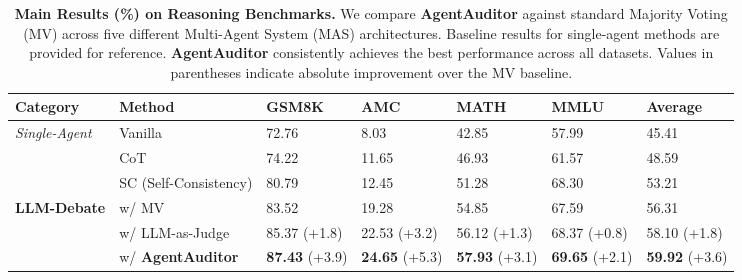 \documentclass{article}
\newcommand{\cgap}[1]{\scriptsize{\color{teal}(+#1)}}
\theoremstyle{plain}
\theoremstyle{definition}
\theoremstyle{remark}
\begin{document}



\begin{table}[t]
\centering
\small
\setlength{\tabcolsep}{6pt} 
\renewcommand{\arraystretch}{0.9}
\caption{
\textbf{Main Results (\%) on Reasoning Benchmarks.} 
We compare \textbf{AgentAuditor} against standard Majority Voting (MV) across five different Multi-Agent System (MAS) architectures. 
Baseline results for single-agent methods are provided for reference.
\textbf{AgentAuditor} consistently achieves the best performance across all datasets.
Values in parentheses indicate absolute improvement over the MV baseline.
}
\label{tab:main_results}

\begin{tabular}{l l l l l l l}
\textbf{Category} & \textbf{Method} & \textbf{GSM8K} & \textbf{AMC} & \textbf{MATH} & \textbf{MMLU} & \textbf{Average} \\
\toprule
\multirow{3}{*}{\textit{Single-Agent}} 
 & Vanilla & 72.76 & 8.03 & 42.85 & 57.99 & 45.41 \\
 & CoT     & 74.22 & 11.65 & 46.93 & 61.57 & 48.59 \\
 & SC (Self-Consistency) & 80.79 & 12.45 & 51.28 & 68.30 & 53.21 \\

\midrule


\multirow{2}{*}{\textbf{LLM-Debate}} 
 & w/ MV & 83.52 & 19.28 & 54.85 & 67.59 & 56.31\\
 & w/ LLM-as-Judge & 85.37 \cgap{1.8} & 22.53 \cgap{3.2} & 56.12 \cgap{1.3} & 68.37 \cgap{0.8} & 58.10 \cgap{1.8}\\
 & \cellcolor{graybg}w/ \textbf{AgentAuditor} & \cellcolor{graybg}\textbf{87.43} \cgap{3.9} & \cellcolor{graybg}\textbf{24.65} \cgap{5.3} & \cellcolor{graybg}\textbf{57.93} \cgap{3.1} & \cellcolor{graybg}\textbf{69.65} \cgap{2.1} &
 \cellcolor{graybg}\textbf{59.92} \cgap{3.6}\\
\midrule


\end{tabular}
\end{table}
\end{document}
